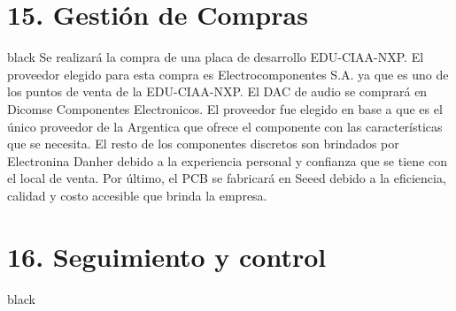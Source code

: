 \documentclass[11pt]{charter}
\begin{document}
\section{15. Gestión de Compras}
\label{sec:compras}

\begin{consigna}{black}
Se realizará la compra de una placa de desarrollo EDU-CIAA-NXP. El
proveedor elegido para esta compra es Electrocomponentes S.A. ya que es uno de los
puntos de venta de la EDU-CIAA-NXP.\newline 
\newline 
El DAC de audio se comprará en Dicomse Componentes Electronicos. El proveedor fue elegido en base a que es el único proveedor de la Argentica que ofrece el componente con las características que se necesita.\newline  
\newline 
El resto de los componentes discretos son brindados por Electronina Danher debido a la experiencia personal y confianza que se tiene con el local de venta. \newline 
\newline 
Por último, el PCB se fabricará en Seeed debido a la eficiencia, calidad y costo accesible que brinda la empresa.
\end{consigna}

\section{16. Seguimiento y control}
\label{sec:seguimiento}

\begin{consigna}{black}

\end{consigna}
\end{document}
